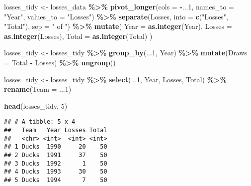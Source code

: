 \documentclass[
]{article}
\newenvironment{Shaded}{\begin{snugshade}}{\end{snugshade}}
\newcommand{\AttributeTok}[1]{\textcolor[rgb]{0.13,0.29,0.53}{#1}}
\newcommand{\DecValTok}[1]{\textcolor[rgb]{0.00,0.00,0.81}{#1}}
\newcommand{\FunctionTok}[1]{\textcolor[rgb]{0.13,0.29,0.53}{\textbf{#1}}}
\newcommand{\NormalTok}[1]{#1}
\newcommand{\OtherTok}[1]{\textcolor[rgb]{0.56,0.35,0.01}{#1}}
\newcommand{\SpecialCharTok}[1]{\textcolor[rgb]{0.81,0.36,0.00}{\textbf{#1}}}
\newcommand{\StringTok}[1]{\textcolor[rgb]{0.31,0.60,0.02}{#1}}
\begin{document}
\begin{Shaded}
\begin{Highlighting}[]
\NormalTok{losses\_tidy }\OtherTok{\textless{}{-}}\NormalTok{ losses\_data }\SpecialCharTok{\%\textgreater{}\%}
    \FunctionTok{pivot\_longer}\NormalTok{(}\AttributeTok{cols =} \SpecialCharTok{{-}}\NormalTok{...}\DecValTok{1}\NormalTok{, }\AttributeTok{names\_to =} \StringTok{"Year"}\NormalTok{, }\AttributeTok{values\_to =} \StringTok{"Losses"}\NormalTok{) }\SpecialCharTok{\%\textgreater{}\%}
    \FunctionTok{separate}\NormalTok{(Losses, }\AttributeTok{into =} \FunctionTok{c}\NormalTok{(}\StringTok{"Losses"}\NormalTok{, }\StringTok{"Total"}\NormalTok{), }\AttributeTok{sep =} \StringTok{" of "}\NormalTok{) }\SpecialCharTok{\%\textgreater{}\%}
    \FunctionTok{mutate}\NormalTok{(}
        \AttributeTok{Year =} \FunctionTok{as.integer}\NormalTok{(Year),}
        \AttributeTok{Losses =} \FunctionTok{as.integer}\NormalTok{(Losses),}
        \AttributeTok{Total =} \FunctionTok{as.integer}\NormalTok{(Total)}
\NormalTok{    )}

\NormalTok{losses\_tidy }\OtherTok{\textless{}{-}}\NormalTok{ losses\_tidy }\SpecialCharTok{\%\textgreater{}\%}
    \FunctionTok{group\_by}\NormalTok{(...}\DecValTok{1}\NormalTok{, Year) }\SpecialCharTok{\%\textgreater{}\%}
    \FunctionTok{mutate}\NormalTok{(}\AttributeTok{Draws =}\NormalTok{ Total }\SpecialCharTok{{-}}\NormalTok{ Losses) }\SpecialCharTok{\%\textgreater{}\%}
    \FunctionTok{ungroup}\NormalTok{()}

\NormalTok{losses\_tidy }\OtherTok{\textless{}{-}}\NormalTok{ losses\_tidy }\SpecialCharTok{\%\textgreater{}\%}
    \FunctionTok{select}\NormalTok{(...}\DecValTok{1}\NormalTok{, Year, Losses, Total) }\SpecialCharTok{\%\textgreater{}\%} 
    \FunctionTok{rename}\NormalTok{(}\AttributeTok{Team =}\NormalTok{ ...}\DecValTok{1}\NormalTok{)}


\FunctionTok{head}\NormalTok{(losses\_tidy, }\DecValTok{5}\NormalTok{)}
\end{Highlighting}
\end{Shaded}

\begin{verbatim}
## # A tibble: 5 x 4
##   Team   Year Losses Total
##   <chr> <int>  <int> <int>
## 1 Ducks  1990     20    50
## 2 Ducks  1991     37    50
## 3 Ducks  1992      1    50
## 4 Ducks  1993     30    50
## 5 Ducks  1994      7    50
\end{verbatim}
\end{document}
